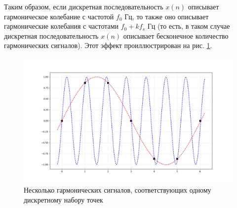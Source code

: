 \documentclass[12pt]{article}
\begin{document}
Таким образом, если дискретная последовательность $x(n)$ описывает гармоническое колебание с частотой $f_0$ Гц, то также оно описывает гармонические колебания с частотами $f_0 + k f_s$ Гц (то есть, в таком случае дискретная последовательность $x(n)$ описывает бесконечное количество гармонических сигналов). Этот эффект проиллюстрирован на рис. \ref{fig:aliasing}.   

\begin{figure}[!ht]
	\centering
	\includegraphics[width = 0.85\linewidth]{../pictures/aliasing.png}
	\caption{Несколько гармонических сигналов, соответствующих одному дискретному набору точек}
	\label{fig:aliasing}
\end{figure}
\end{document}
